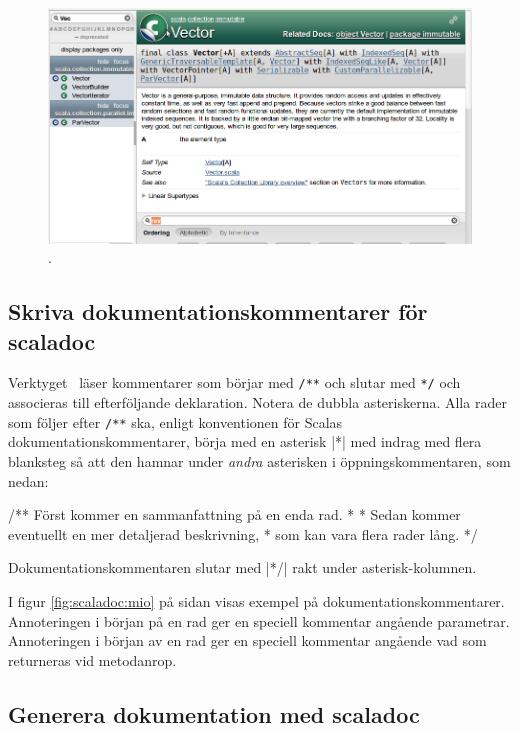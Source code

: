 \begin{figure}[H]
\centering
\includegraphics[width=1.0\textwidth]{../img/scaladoc/scaladoc-vec}

     \caption{ \scaladoc.}
    \label{fig:scaladoc:vector}
\end{figure}


\subsection{Skriva dokumentationskommentarer för scaladoc}


Verktyget \scaladoc~läser kommentarer som börjar med \verb|/**| och slutar med \verb|*/| och associeras till efterföljande deklaration. Notera de dubbla asteriskerna. Alla rader som följer efter \verb|/**| ska, enligt konventionen för Scalas dokumentationskommentarer, börja med en asterisk \code|*| med indrag med flera blanksteg så att den hamnar under \textit{andra} asterisken i öppningskommentaren, som nedan:
\begin{Code}
/** Först kommer en sammanfattning på en enda rad. 
  * 
  * Sedan kommer eventuellt en mer detaljerad beskrivning, 
  * som kan vara flera rader lång.
  */
\end{Code}
Dokumentationskommentaren slutar med \code|*/| rakt under asterisk-kolumnen.

I figur \ref{fig:scaladoc:mio} på sidan \pageref{fig:scaladoc:mio} visas exempel på dokumentationskommentarer. Annoteringen  i början på en rad ger en speciell kommentar angående parametrar. Annoteringen  i början av en rad ger en speciell kommentar angående vad som returneras vid metodanrop.


\subsection{Generera dokumentation med scaladoc}


